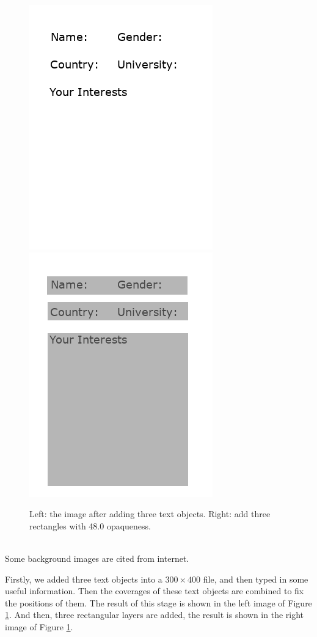\documentclass{article}
\begin{document}
\begin{figure}[h]
    \centering
    \includegraphics{img/sectionPNG/table2.png}
    \includegraphics{img/sectionPNG/table1.png}
    \caption{Left: the image after adding three text objects. 
    Right: add three rectangles with 48.0 opaqueness.}
    \label{fig: figure2}
\end{figure}

~\\
\noindent
Some background images are cited from internet.

\noindent
Firstly, we added three text objects into a $ 300 \times 400 $ file, and then 
typed in some useful information. Then the coverages of these text objects are
combined to fix the positions of them. The result of this stage is shown in the 
left image of Figure \ref{fig: figure2}. And then, three rectangular layers are 
added, the result is shown in the right image of Figure \ref{fig: figure2}. 
\end{document}
